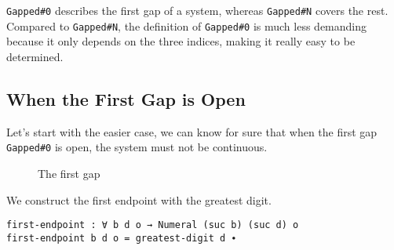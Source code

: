 \documentclass[\main/thesis.tex]{subfiles}
\begin{document}
\lstinline|Gapped#0| describes the first gap of a system, whereas
\lstinline|Gapped#N| covers the rest.
Compared to \lstinline|Gapped#N|, the definition of \lstinline|Gapped#0| is much
less demanding because it only depends on the three indices, making it really
easy to be determined.

\subsection{When the First Gap is Open}

Let's start with the easier case, we can know for sure that when the first gap
\lstinline|Gapped#0| is open, the system must not be continuous.

\begin{figure}[H]
    \centering
    \begin{adjustbox}{max width=\textwidth}
    \end{adjustbox}
\caption{The first gap}
\label{figure:29}
\end{figure}


We construct the first endpoint with the greatest digit.

\begin{lstlisting}
first-endpoint : ∀ b d o → Numeral (suc b) (suc d) o
first-endpoint b d o = greatest-digit d ∙
\end{lstlisting}
\end{document}
